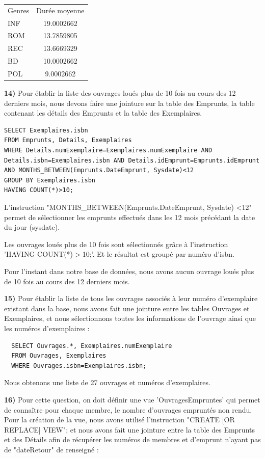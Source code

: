 \documentclass[a4paper,12pt]{article}
\begin{document}
\begin{tabular}{ l | c }
Genres & Durée moyenne \\
INF  & 19.0002662 \\
ROM  & 13.7859805\\
REC &  13.6669329\\
BD  &  10.0002662\\
POL &   9.0002662\\
 \end{tabular}

  \textbf {14)} Pour établir la liste des ouvrages loués plus de 10 fois au cours des 12 derniers mois, nous devons faire une jointure sur la table des Emprunts, la table contenant les détails des Emprunts et la table des Exemplaires. 
\begin{lstlisting}
SELECT Exemplaires.isbn 
FROM Emprunts, Details, Exemplaires 
WHERE Details.numExemplaire=Exemplaires.numExemplaire AND Details.isbn=Exemplaires.isbn AND Details.idEmprunt=Emprunts.idEmprunt AND MONTHS_BETWEEN(Emprunts.DateEmprunt, Sysdate)<12 
GROUP BY Exemplaires.isbn 
HAVING COUNT(*)>10;
\end{lstlisting}

L'instruction "MONTHS\_BETWEEN(Emprunts.DateEmprunt, Sysdate) \textless 12" permet de sélectionner les emprunts effectués dans les 12 mois précédant la date du jour (sysdate). 

Les ouvrages loués plus de 10 fois sont sélectionnés grâce à l'instruction 'HAVING COUNT(*)$>$10;'. Et le résultat est groupé par numéro d'isbn. 

Pour l'instant dans notre base de données, nous avons aucun ouvrage loués plus de 10 fois au cours des 12 derniers mois. 

  \textbf {15)} Pour établir  la  liste  de  tous  les  ouvrages  associés à leur numéro d’exemplaire existant dans la base, nous avons fait une jointure entre les tables Ouvrages et Exemplaires, et nous sélectionnons toutes les informations de l'ouvrage ainsi que les numéros d'exemplaires : 

  \begin{lstlisting}
  SELECT Ouvrages.*, Exemplaires.numExemplaire 
  FROM Ouvrages, Exemplaires 
  WHERE Ouvrages.isbn=Exemplaires.isbn;
  \end{lstlisting}

Nous obtenons une liste de 27 ouvrages et numéros d'exemplaires. 
  
  \textbf {16)} Pour cette question, on doit définir une vue 'OuvragesEmpruntes' qui permet de connaître pour chaque membre, le nombre d'ouvrages empruntés non rendu. Pour la création de la vue, nous avons utilisé l'instruction "CREATE  [OR REPLACE] VIEW"; et nous avons fait une jointure entre la table des Emprunts et des Détails afin de récupérer les numéros de membres et d'emprunt n'ayant pas de "dateRetour" de renseigné :  
\end{document}
